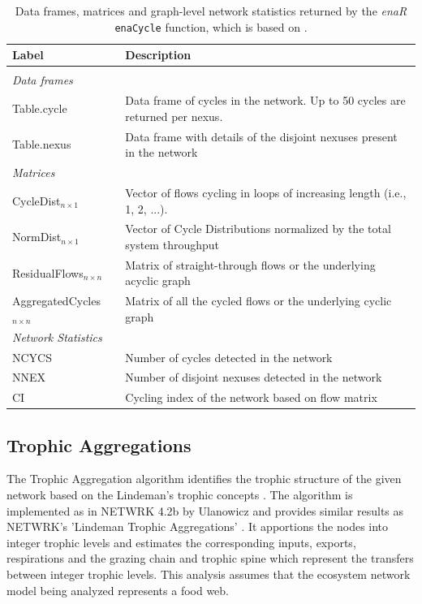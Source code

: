 \documentclass[article]{jss}
\begin{document}
 \begin{table}[t]
  \caption{Data frames, matrices and graph-level network statistics returned by the \textit{enaR}    %
    \texttt{enaCycle} function, which is based on \citep{ulanowicz83}.}\label{tab:cycle}
  \center
  \begin{small}
    \begin{tabular}{l p{10 cm}}
      \textbf{Label} & \textbf{Description} \\ \hline \\[-1.5ex]
      \multicolumn{2}{l}{\textit{Data frames}} \\[1ex]
      Table.cycle & Data frame of cycles in the network. Up to 50
      cycles are returned per nexus.  \\
      Table.nexus & Data frame with details of the disjoint nexuses present in the network\\[1ex]
      \multicolumn{2}{l}{\textit{Matrices}} \\[1ex]
      CycleDist$_{n \times 1}$ & Vector of flows cycling in loops of
      increasing length (i.e., 1, 2, ...). \\  %
      NormDist$_{n \times 1}$ & Vector of Cycle Distributions normalized by the total system throughput \\
      ResidualFlows$_{n \times n}$ & Matrix of straight-through flows or the underlying acyclic graph\\
      AggregatedCycles$_{n \times n}$ & Matrix of all the cycled flows or the underlying cyclic graph\\[1ex]
      \multicolumn{2}{l}{\textit{Network Statistics}} \\[1ex]
      NCYCS & Number of cycles detected in the network\\
      NNEX & Number of disjoint nexuses detected in the network\\
      CI & Cycling index of the network based on flow matrix\\ \hline
\end{tabular}
\end{small}
\end{table}


\subsection{Trophic Aggregations}
The Trophic Aggregation algorithm identifies the trophic structure
of the given network based on the Lindeman's trophic concepts
\citep{lindeman42}. The algorithm is implemented as in NETWRK 4.2b
by Ulanowicz \citep{ulanowicz1979trophic} and provides similar
results as NETWRK's 'Lindeman Trophic Aggregations' \citep{ulanowicz91}.
It apportions the nodes into integer trophic levels and estimates the
corresponding inputs, exports, respirations and the grazing chain and
trophic spine which represent the transfers between integer trophic
levels.  This analysis assumes that the ecosystem network model being
analyzed represents a food web.
\end{document}
